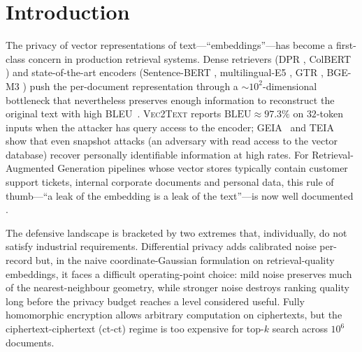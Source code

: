 \section{Introduction}

The privacy of vector representations of text---``embeddings''---has become
a first-class concern in production retrieval systems. Dense retrievers
(DPR \cite{ref_dpr}, ColBERT \cite{ref_colbert}) and state-of-the-art
encoders (Sentence-BERT \cite{ref_sbert}, multilingual-E5 \cite{ref_e5},
GTR \cite{ref_gtr}, BGE-M3 \cite{ref_bgem3}) push the per-document
representation through a
$\sim 10^2$-dimensional bottleneck that nevertheless preserves enough
information to reconstruct the original text with high BLEU~\cite{ref_bleu}.
\textsc{Vec2Text} \cite{ref_vec2text} reports
$\mathrm{BLEU} \approx 97.3\%$ on $32$-token inputs when the attacker has
query access to the encoder; \textsc{GEIA}~\cite{ref_geia} and
\textsc{TEIA}~\cite{ref_teia} show that even snapshot attacks
(an adversary with read access to the vector database) recover personally
identifiable information at high rates. For Retrieval-Augmented Generation
pipelines whose vector stores typically contain customer support tickets,
internal corporate documents and personal data, this rule of thumb---``a
leak of the embedding is a leak of the text''---is now well documented
\cite{ref_rag,ref_zeng_rag}.

The defensive landscape is bracketed by two extremes that, individually,
do not satisfy industrial requirements. Differential privacy
\cite{ref_dwork,ref_dpsgd} adds calibrated noise per-record but, in the
naive coordinate-Gaussian formulation on retrieval-quality embeddings, it
faces a difficult operating-point choice: mild noise preserves much of the
nearest-neighbour geometry, while stronger noise destroys ranking quality
long before the privacy budget reaches a level considered useful.
Fully homomorphic encryption \cite{ref_ckks,ref_openfhe}
allows arbitrary computation on ciphertexts, but the
ciphertext-ciphertext (ct-ct) regime is too expensive for top-$k$ search
across $10^6$ documents.

